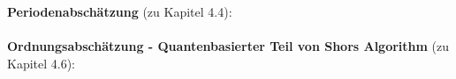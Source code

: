 \textbf{Periodenabschätzung} (zu Kapitel 4.4):

\paragraph{}

\textbf{Ordnungsabschätzung - Quantenbasierter Teil von Shors Algorithm} (zu Kapitel 4.6):

\paragraph{}


\addtocounter{page}{-1}
\thispagestyle{empty}
\null\newpage